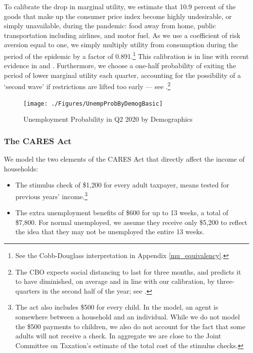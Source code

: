 \documentclass[titlepage,a4paper]{\econtex}
\begin{document}
To calibrate the drop in marginal utility, we estimate that 10.9 percent of the goods that make up the consumer price index become highly undesirable, or simply unavailable, during the pandemic: food away from home, public transportation including airlines, and motor fuel.
As we use a coefficient of risk aversion equal to one, we simply multiply utility from consumption during the period of the epidemic by a factor of 0.891.\footnote{See the Cobb-Douglass interpretation in Appendix \ref{mu_equivalency}.} 
This calibration is in line with recent evidence in \cite{covidC_chase} and \cite{chetty_covidC}.
Furthermore, we choose a one-half probability of exiting the period of lower marginal utility each quarter, accounting for the possibility of a `second wave' if restrictions are lifted too early --- see \cite{cyranoski_we_2020}.\footnote{The CBO expects social distancing to last for three months, and predicts it to have diminished, on average and in line with our calibration, by three-quarters in the second half of the year; see \cite{SwagelCBO2020}.}

\hypertarget{unemployment-demographics}{}
\begin{figure}
  \centering
  \caption{Unemployment Probability in Q2 2020 by Demographics}
  \label{unemployment_demographics}
  { \texttt{[image: ./Figures/UnempProbByDemogBasic]}}
\end{figure}


\subsubsection{The CARES Act}

We model the two elements of the CARES Act that directly affect the income of households:
\begin{itemize}
\item The stimulus check of \$1,200 for every adult taxpayer, means tested for previous years' income.\footnote{The act also includes \$500 for every child. In the model, an agent is somewhere between a household and an individual. While we do not model the \$500 payments to children, we also do not account for the fact that some adults will not receive a check. In aggregate we are close to the Joint Committee on Taxation's estimate of the total cost of the stimulus checks.}
\item The extra unemployment benefits of \$600 for up to 13 weeks, a total of \$7,800.
  For normal unemployed, we assume they receive only \$5,200 to reflect the idea that they may not be unemployed the entire 13 weeks.
\end{itemize}
\end{document}
